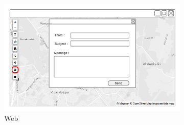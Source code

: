\begin{figure}[ht]
    \centering
    \begin{subfigure}[b]{0.6\textwidth}
        \includegraphics[width=\textwidth]
          {img/c02-application/png/web-basemap-contact.png}
        \caption{Web}
    \end{subfigure}
    ~
    \begin{subfigure}[b]{0.2\textwidth}

\end{subfigure}
\end{figure}
